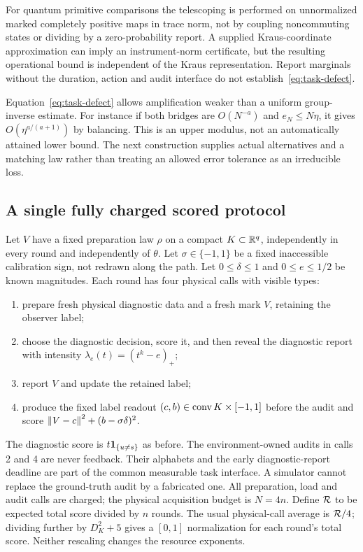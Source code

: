 For quantum primitive comparisons the telescoping is performed on unnormalized marked completely positive maps in trace norm, not by coupling noncommuting states or dividing by a zero-probability report. A supplied Kraus-coordinate approximation can imply an instrument-norm certificate, but the resulting operational bound is independent of the Kraus representation. Report marginals without the duration, action and audit interface do not establish~\eqref{eq:task-defect}.

Equation~\eqref{eq:task-defect} allows amplification weaker than a uniform group-inverse estimate. For instance if both bridges are $O(N^{-a})$ and $e_N\le N\eta$, it gives $O(\eta^{a/(a+1)})$ by balancing. This is an upper modulus, not an automatically attained lower bound. The next construction supplies actual alternatives and a matching law rather than treating an allowed error tolerance as an irreducible loss.

\subsection{A single fully charged scored protocol}
Let $V$ have a fixed preparation law $\rho$ on a compact $K\subset\mathbb R^q$, independently in every round and independently of $\theta$. Let $\sigma\in\{-1,1\}$ be a fixed inaccessible calibration sign, not redrawn along the path. Let $0\le\delta\le1$ and $0\le e\le1/2$ be known magnitudes. Each round has four physical calls with visible types:
\begin{enumerate}
\item prepare fresh physical diagnostic data and a fresh mark $V$, retaining the observer label;
\item choose the diagnostic decision, score it, and then reveal the diagnostic report with intensity $\lambda_e(t)=(t^k-e)_+$;
\item report $V$ and update the retained label;
\item produce the fixed label readout $(c,b)\in\operatorname{conv} K\times[-1,1]$ before the audit and score $\left\lVert V-c\right\rVert^2+(b-\sigma\delta)^2$.
\end{enumerate}
The diagnostic score is $t\mathbf 1_{\{u\ne s\}}$ as before. The environment-owned audits in calls 2 and 4 are never feedback. Their alphabets and the early diagnostic-report deadline are part of the common measurable task interface. A simulator cannot replace the ground-truth audit by a fabricated one. All preparation, load and audit calls are charged; the physical acquisition budget is $N=4n$. Define $\mathcal R$ to be expected total score divided by $n$ rounds. The usual physical-call average is $\mathcal R/4$; dividing further by $D_K^2+5$ gives a $[0,1]$ normalization for each round's total score. Neither rescaling changes the resource exponents.

